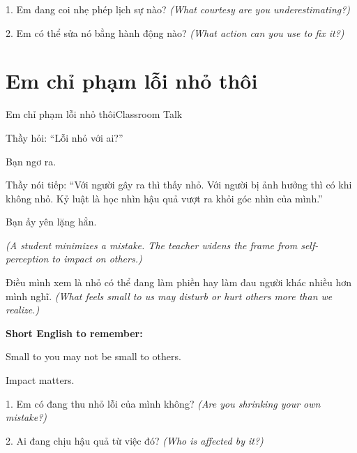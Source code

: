 \begin{tuhocnhanh}
1. Em đang coi nhẹ phép lịch sự nào? \textit{(What courtesy are you underestimating?)}

2. Em có thể sửa nó bằng hành động nào? \textit{(What action can you use to fix it?)}
\end{tuhocnhanh}
\ngancach

\section{Em chỉ phạm lỗi nhỏ thôi}
\begin{truyen}{Em chỉ phạm lỗi nhỏ thôi}{Classroom Talk}

Thầy hỏi: ``Lỗi nhỏ với ai?''

Bạn ngơ ra.

Thầy nói tiếp: ``Với người gây ra thì thấy nhỏ. Với người bị ảnh hưởng thì có khi không nhỏ. Kỷ luật là học nhìn hậu quả vượt ra khỏi góc nhìn của mình.''

Bạn ấy yên lặng hẳn.

\textit{(A student minimizes a mistake. The teacher widens the frame from self-perception to impact on others.)}
\end{truyen}

\begin{baihoc}
Điều mình xem là nhỏ có thể đang làm phiền hay làm đau người khác nhiều hơn mình nghĩ.
\textit{(What feels small to us may disturb or hurt others more than we realize.)}
\end{baihoc}

\begin{ghinhoanh}
\textbf{Short English to remember:}

Small to you may not be small to others.

Impact matters.
\end{ghinhoanh}

\begin{tuhocnhanh}
1. Em có đang thu nhỏ lỗi của mình không? \textit{(Are you shrinking your own mistake?)}

2. Ai đang chịu hậu quả từ việc đó? \textit{(Who is affected by it?)}
\end{tuhocnhanh}
\ngancach


